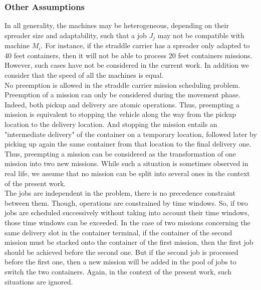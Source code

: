 \documentclass[a4paper,10pt]{article}
\begin{document}
\subsubsection{Other Assumptions}

In all generality, the machines may be heterogeneous, depending on their spreader size and adaptability, such that a job $J_j$ may not be compatible with machine $M_i$. For instance, if the straddle carrier has a spreader only adapted to 40 feet containers, then it will not be able to process 20 feet containers missions. However, such cases have not be considered in the current work. In addition we consider that the speed of all the machines is equal. \\

No preemption is allowed in the straddle carrier mission scheduling problem. Preemption of a mission can only be considered during the movement phase. Indeed, both pickup and delivery are atomic operations. Thus, preempting a mission is equivalent to stopping the vehicle along the way from the pickup location to the delivery location. And stopping the mission entails an "intermediate delivery" of the container on a temporary location, followed later by picking up again the same container from that location to the final delivery one. Thus, preempting a mission can be considered as the transformation of one mission into two new missions. While such a situation is sometimes observed in real life, we assume that no mission can be split into several ones in the context of the present work.\\

The jobs are independent in the problem, there is no precedence constraint between them. Though, operations are constrained by time windows. So, if two jobs are scheduled successively without taking into account their time windows, those time windows can be exceeded. In the case of two missions concerning the same delivery slot in the container terminal, if the container of the second mission must be stacked onto the container of the first mission, then the first job should be achieved before the second one. But if the second job is processed before the first one, then a new mission will be added in the pool of jobs to switch the two containers. Again, in the context of the present work, such situations are ignored. %
\end{document}
